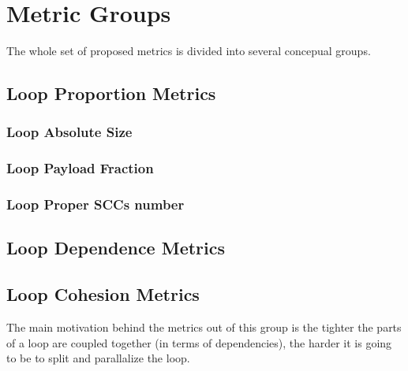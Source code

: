 \section{Metric Groups}
\label{metrics-metric-groups}

\qquad The whole set of proposed metrics is divided into several concepual groups. 

\subsection{Loop Proportion Metrics}
\subsubsection{Loop Absolute Size}
\subsubsection{Loop Payload Fraction}
\subsubsection{Loop Proper SCCs number}

\subsection{Loop Dependence Metrics}

\subsection{Loop Cohesion Metrics}
\qquad The main motivation behind the metrics out of this group is the tighter the parts of a loop are coupled together (in terms of dependencies), the harder it is going to be to split and parallalize the loop.   


